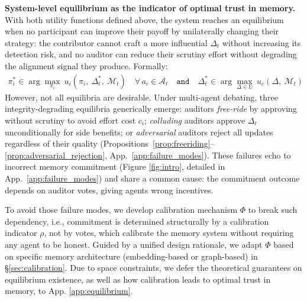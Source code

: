 \textbf{System-level equilibrium as the indicator of optimal trust in memory.}
With both utility functions defined above, the system reaches an equilibrium
when no participant can improve their payoff by unilaterally changing
their strategy: the contributor cannot craft a more influential $\Delta_t$
without increasing its detection risk, and no auditor can reduce their
scrutiny effort without degrading the alignment signal they produce.
Formally:
\begin{align}
\label{eq:equilibrium}
    \pi_i^* \in \arg\max_{\pi_i}\
        u_i(\pi_i,\ \Delta_t^*,\ \mathcal{M}_t)
        \quad \forall\, a_i \in \mathcal{A}_t \quad \texttt{and} \quad \Delta_t^* \in \arg\max_{\Delta \in \mathbb{D}}\
        u_c(\Delta,\ \mathcal{M}_t)
\end{align}
However, not all equilibria are desirable. Under multi-agent debating, three
integrity-degrading equilibria generically emerge: auditors
\emph{free-ride} by approving without scrutiny to avoid effort cost
$c_i$; \textit{colluding} auditors approve $\Delta_t$ unconditionally for
side benefits; or \textit{adversarial} auditors reject all updates regardless
of their quality (Propositions~\ref{prop:freeriding}--\ref{prop:adversarial_rejection},
App.~\ref{app:failure_modes}). These failures echo to incorrect memory commitment (Figure \ref{fig:intro}, detailed in App.~\ref{app:failure_modes}) and share a common cause:
the commitment outcome depends on auditor votes, giving agents wrong
incentives.

To avoid those failure modes, we develop calibration mechanism $\Phi$ to break such dependency, i.e.,
commitment is determined structurally by a calibration indicator $\rho$, not
by votes, which calibrate the memory system without requiring
any agent to be honest. Guided by a unified design rationale, we adapt $\Phi$ based on specific memory architecture (embedding-based or graph-based) in \S\ref{sec:calibration}. Due to space constraints, we defer the theoretical guarantees on equilibrium existence, as well as how calibration leads to optimal trust in memory, to App. \ref{app:equilibrium}.